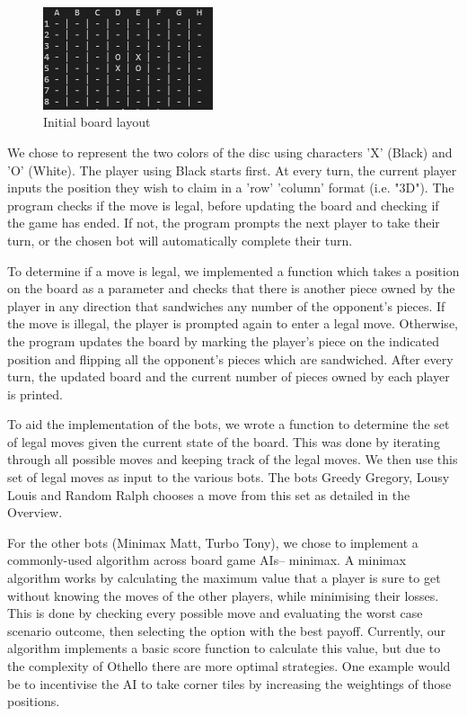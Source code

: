\documentclass[a4paper,11pt]{article}
\begin{document}
\begin{figure}[hpt]
    \centering
    \includegraphics[width=5cm]{othello_initial_board.png}
    \caption{Initial board layout}
    \label{fig:initial othello board}
\end{figure}

We chose to represent the two colors of the disc using characters 'X' (Black) and 'O' (White). The player using Black starts first. At every turn, the current player inputs the position they wish to claim in a 'row' 'column' format (i.e. "3D"). The program checks if the move is legal, before updating the board and checking if the game has ended. If not, the program prompts the next player to take their turn, or the chosen bot will automatically complete their turn. \newline

To determine if a move is legal, we implemented a function which takes a position on the board as a parameter and checks that there is another piece owned by the player in any direction that sandwiches any number of the opponent's pieces. If the move is illegal, the player is prompted again to enter a legal move. Otherwise, the program updates the board by marking the player's piece on the indicated position and flipping all the opponent's pieces which are sandwiched. After every turn, the updated board and the current number of pieces owned by each player is printed. \newline

To aid the implementation of the bots, we wrote a function to determine the set of legal moves given the current state of the board. This was done by iterating through all possible moves and keeping track of the legal moves. We then use this set of legal moves as input to the various bots. The bots Greedy Gregory, Lousy Louis and Random Ralph chooses a move from this set as detailed in the Overview. \newline

For the other bots (Minimax Matt, Turbo Tony), we chose to implement a commonly-used algorithm across board game AIs-- minimax. A minimax algorithm works by calculating the maximum value that a player is sure to get without knowing the moves of the other players, while minimising their losses. This is done by checking every possible move and evaluating the worst case scenario outcome, then selecting the option with the best payoff. Currently, our algorithm implements a basic score function to calculate this value, but due to the complexity of Othello there are more optimal strategies. One example would be to incentivise the AI to take corner tiles by increasing the weightings of those positions.
\end{document}
